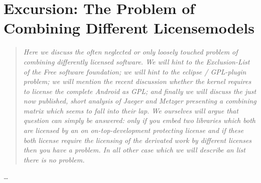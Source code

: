 %
%
%
%
%



\section{Excursion: The Problem of Combining Different Licensemodels}
\footnotesize
\begin{quote}\itshape
Here we discuss the often neglected or only loosely touched problem of combining
differently licensed software. We will hint to the Exclusion-List of the Free
software foundation; we will hint to the eclipse / GPL-plugin problem; we will
mention the recent discussion whether the kernel requires to license the
complete Android as GPL; and finally we will discuss the just now published, short
analysis of Jaeger and Metzger presenting a combining matrix which seems to fall
into their lap. We ourselves will argue that question can simply be answered:
only if you embed two libraries which both are licensed by an on
on-top-development protecting license and if these both license require the
licensing of the derivated work by different licenses then you have a problem.
In all other case which we will describe an list there is no problem.
\end{quote}
\normalsize
\ldots

%

